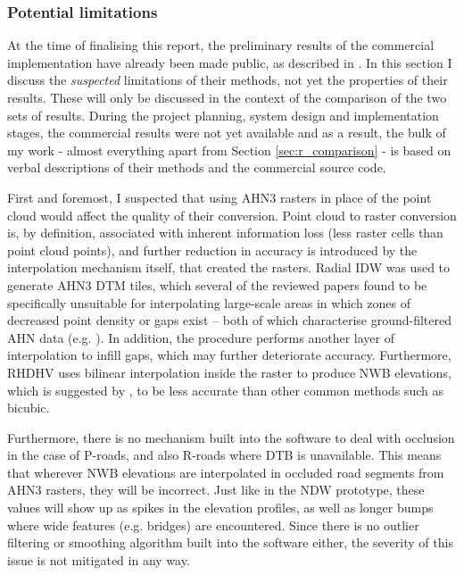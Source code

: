\subsubsection{Potential limitations}

At the time of finalising this report, the preliminary results of the commercial implementation have already been made public, as described in \cite{nwb_hoogte}. In this section I discuss the \textit{suspected} limitations of their methods, not yet the properties of their results. These will only be discussed in the context of the comparison of the two sets of results. During the project planning, system design and implementation stages, the commercial results were not yet available and as a result, the bulk of my work - almost everything apart from Section \ref{sec:r_comparison} - is based on verbal descriptions of their methods and the commercial source code.

First and foremost, I suspected that using AHN3 rasters in place of the point cloud would affect the quality of their conversion. Point cloud to raster conversion is, by definition, associated with inherent information loss (less raster cells than point cloud points), and further reduction in accuracy is introduced by the interpolation mechanism itself, that created the rasters. Radial IDW was used to generate AHN3 DTM tiles, which several of the reviewed papers found to be specifically unsuitable for interpolating large-scale areas in which zones of decreased point density or gaps exist – both of which characterise ground-filtered AHN data (e.g. \cite{guo_etal_2010}). In addition, the procedure performs another layer of interpolation to infill gaps, which may further deteriorate accuracy. Furthermore, RHDHV uses bilinear interpolation inside the raster to produce NWB elevations, which is suggested by \cite{shi_etal_2005}, to be less accurate than other common methods such as bicubic.

Furthermore, there is no mechanism built into the software to deal with occlusion in the case of P-roads, and also R-roads where DTB is unavailable. This means that wherever NWB elevations are interpolated in occluded road segments from AHN3 rasters, they will be incorrect. Just like in the NDW prototype, these values will show up as spikes in the elevation profiles, as well as longer bumps where wide features (e.g. bridges) are encountered. Since there is no outlier filtering or smoothing algorithm built into the software either, the severity of this issue is not mitigated in any way.

